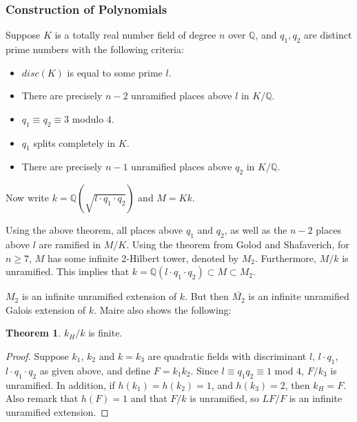 \documentclass[12pt]{extarticle}
\newcommand{\Q}{\mathbb{Q}}
\newcommand{\<}{\langle}
\renewcommand{\>}{\rangle}
\theoremstyle{definition}
\newtheorem{theorem}{Theorem}
\begin{document}
\subsubsection*{Construction of Polynomials}
Suppose $K$ is a totally real number field of degree $n$ over $\Q$, and $q_1,q_2$ are distinct prime numbers with the following criteria:
\begin{itemize}
\item $disc(K)$ is equal to some prime $l$.
\item There are precisely $n-2$ unramified places above $l$ in $K/\Q$. 
\item $q_1 \equiv q_2 \equiv 3 $ modulo $4$.
\item $q_1$ splits completely in $K$.
\item There are precisely $n-1$ unramified places above $q_2$ in $K/\Q$. 
\end{itemize}\par

Now write $k=\Q(\sqrt{l \cdot q_1 \cdot q_2})$ and $M=Kk$. 

Using the above theorem, all places above $q_1$ and $q_2$, as well as the $n-2$ places above $l$ are ramified in $M/K$. Using the theorem from Golod and Shafaverich, for $n \geq 7$, $M$ has some infinite 2-Hilbert tower, denoted by $M_2$. Furthermore, $M/k$ is unramified. This implies that 
$k = \Q(l \cdot q_1 \cdot q_2) \subset M \subset M_2$.\par
$M_2$ is an infinite unramified extension of $k$. But then $\bar{M_2}$ is an infinite unramified Galois extension of $k$. Maire also shows the following:
\begin{theorem}
$k_H/k$ is finite.
\end{theorem}
\begin{proof}
Suppose $k_1$, $k_2$ and $k=k_3$ are quadratic fields with discriminant $l$, $l \cdot q_1$, $l \cdot q_1 \cdot q_2$ as given above, and define $F = k_1 k_2$. Since $l \equiv q_1q_2 \equiv 1$ mod $4$, $F/k_3$ is unramified. In addition, if $h(k_1) = h(k_2) =1$, and $h(k_3) = 2$, then $k_H = F$. Also remark that $h(F)=1$ and that $F/k$ is unramified, so $LF/F$ is an infinite unramified extension.
\end{proof}
\end{document}
